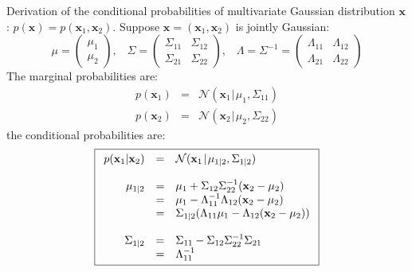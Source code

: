 \documentclass{article}
\begin{document}
\noindent
Derivation of the conditional probabilities of multivariate Gaussian distribution $\textbf{x}$: $p(\textbf{x}) = p(\textbf{x}_1, \textbf{x}_2)$.
Suppose $\textbf{x} = (\textbf{x}_1, \textbf{x}_2)$ is jointly Gaussian:
\begin{equation*}
\mu = \begin{pmatrix} \mu_1 \\ \mu_2 \end{pmatrix}, \hspace{10pt} \Sigma = \begin{pmatrix} \Sigma_{11} & \Sigma_{12} \\ \Sigma_{21} & \Sigma_{22}  \end{pmatrix}, \hspace{10pt} \Lambda = \Sigma^{-1} = \begin{pmatrix} \Lambda_{11} & \Lambda_{12} \\ \Lambda_{21} & \Lambda_{22}  \end{pmatrix}
\end{equation*}
The marginal probabilities are:
\begin{eqnarray*}
p(\textbf{x}_1) &=& \mathcal{N} (\textbf{x}_1 \hspace{1pt} | \hspace{1pt} \mu_1, \Sigma_{11}) \\
p(\textbf{x}_2) &=& \mathcal{N} (\textbf{x}_2 \hspace{1pt} | \hspace{1pt} \mu_2, \Sigma_{22}) 
\end{eqnarray*}
the conditional probabilities are:
\begin{equation}
\boxed{
\begin{array}{r c l }
p(\textbf{x}_1 | \textbf{x}_2) &=& \mathcal{N} (\textbf{x}_1 \hspace{1pt} | \hspace{1pt} \mu_{1 | 2}, \Sigma_{1 | 2}) \\
\\
\mu_{1 | 2} &=& \mu_1 + \Sigma_{12} \Sigma_{22}^{-1} (\textbf{x}_2 - \mu_2) \\
&=& \mu_1 - \Lambda_{11}^{-1} \Lambda_{12} (\textbf{x}_2 - \mu_2) \\
&=& \Sigma_{1 | 2} (\Lambda_{11} \mu_1 - \Lambda_{12} (\textbf{x}_2 - \mu_2)) \\
\\
\Sigma_{1 | 2} &=& \Sigma_{11} - \Sigma_{12} \Sigma_{22}^{-1} \Sigma_{21} \\
&=& \Lambda_{11}^{-1}
\end{array}
}
\end{equation}
\end{document}
